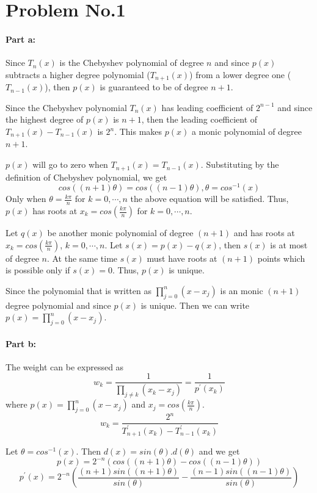 \section*{Problem No.1} \label{sec:prob1}

\paragraph{Part a:} 

Since $T_{n}(x)$ is the Chebyshev polynomial of degree $n$ and since $p(x)$ subtracts a higher degree polynomial ($T_{n+1}(x)$) from a lower degree one ($T_{n-1}(x)$), then $p(x)$ is guaranteed to be of degree $n+1$. 

Since the Chebyshev polynomial $T_{n}(x)$ has leading coefficient of $2^{n-1}$ and since the highest degree of $p(x)$ is $n+1$, then the leading coefficient of $T_{n+1}(x)-T_{n-1}(x)$ is $2^{n}$. This makes $p(x)$ a monic polynomial of degree $n+1$. 

$p(x)$ will go to zero when $T_{n+1}(x) = T_{n-1}(x)$. Substituting by the definition of Chebyshev polynomial, we get 
\[
cos((n+1)\theta) =  cos((n-1)\theta), \theta = cos^{-1}(x)
\]
Only when $\theta = \frac{k\pi}{n}$ for $k=0,\cdots, n$ the above equation will be satisfied. Thus, $p(x)$ has roots at $x_{k}=cos(\frac{k\pi}{n})$ for $k=0,\cdots, n$. 


Let $q(x)$ be another monic polynomial of degree $(n+1)$ and has roots at $x_{k}=cos(\frac{k \pi}{n})$, $k=0,\cdots, n$. Let $s(x)=p(x)-q(x)$, then $s(x)$ is at most of degree $n$. At the same time $s(x)$ must have roots at $(n+1)$ points which is possible only if $s(x)=0$. Thus, $p(x)$ is unique. 

Since the polynomial that is written as $ \prod_{j=0}^{n}(x-x_{j})$ is an monic $(n+1)$ degree polynomial and since $p(x)$ is unique. Then we can write $p(x) = \prod_{j=0}^{n}(x-x_{j})$. 

\paragraph{Part b:} 
The weight can be expressed as 
\[
w_{k} = \frac{1}{\prod_{j\neq k}(x_{k}-x_{j})} = \frac{1}{p^{\prime}(x_{k})}
\]
where $p(x) = \prod_{j=0}^{n}(x-x_{j})$ and $x_{j} = cos(\frac{k\pi}{n})$. 
\[
w_{k} = \frac{2^{n}}{T^{\prime}_{n+1}(x_{k}) - T^{\prime}_{n-1}(x_{k})}
\]

Let $\theta = cos^{-1}(x)$. Then $d(x) = sin(\theta).d(\theta)$ and we get 
\[
p(x) = 2^{-n}\left( cos\left((n+1)\theta \right) - cos\left((n-1)\theta \right) \right)
\]
\[
p^{\prime}(x) = 2^{-n}\left( \frac{(n+1)sin((n+1)\theta)}{sin(\theta)} - \frac{(n-1)sin((n-1)\theta)}{sin(\theta)}\right)
\]

